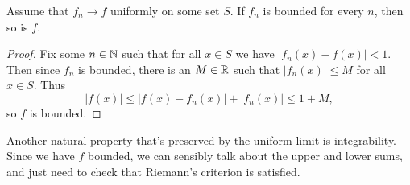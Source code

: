 \documentclass[a4paper]{scrartcl}
\begin{document}
\begin{lemma}\label{lemma:uniform-bounded}
Assume that $f_n \rightarrow f$ uniformly on some set $S$.  
If $f_n$ is bounded for every $n$, then so is $f$.  
\end{lemma}
\begin{proof}
Fix some $n \in \mathbb{N}$ such that for all $x \in S$ we have $|f_n(x) - f(x)| < 1$. Then since $f_n$ is bounded, there is an $M \in \mathbb{R}$ such that $|f_n(x)| \leq M$ for all $x \in S$. Thus
$$
    |f(x)| \leq |f(x) - f_n(x)| + |f_n(x)| \leq 1 + M,
$$
so $f$ is bounded.
\end{proof}

Another natural property that's preserved by the uniform limit is integrability. Since we have $f$ bounded, we can sensibly talk about the upper and lower sums, and just need to check that Riemann's criterion is satisfied.


\end{document}
